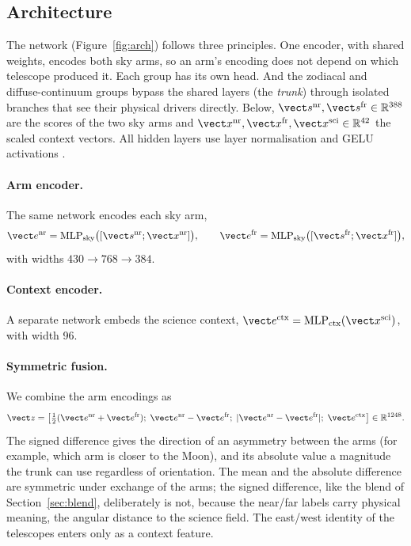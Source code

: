 \subsection{Architecture}
\label{sec:arch}

The network (Figure~\ref{fig:arch}) follows three principles. One encoder,
with shared weights, encodes both sky arms, so an arm's encoding does not
depend on which telescope produced it. Each group has its own head. And the
zodiacal and diffuse-continuum groups bypass the shared layers (the
\emph{trunk}) through isolated branches that see their physical drivers
directly. Below, $\vect s^{\rm nr}, \vect s^{\rm fr}\in\mathbb{R}^{388}$ are the
scores of the two sky arms and $\vect x^{\rm nr}, \vect x^{\rm fr},
\vect x^{\rm sci}\in\mathbb{R}^{42}$ the scaled context vectors. All hidden
layers use layer normalisation \citep{Ba2016} and GELU activations
\citep{Hendrycks2016}.

\paragraph{Arm encoder.} The same network encodes each sky arm,
\begin{equation}
  \vect e^{\rm nr} = \mathrm{MLP}_{\rm sky}\big([\vect s^{\rm nr};\vect x^{\rm nr}]\big),
  \qquad
  \vect e^{\rm fr} = \mathrm{MLP}_{\rm sky}\big([\vect s^{\rm fr};\vect x^{\rm fr}]\big),
\end{equation}
with widths $430\to768\to384$.

\paragraph{Context encoder.} A separate network embeds the science context,
$\vect e^{\rm ctx} = \mathrm{MLP}_{\rm ctx}(\vect x^{\rm sci})$, with width
96.

\paragraph{Symmetric fusion.} We combine the arm encodings as
\begin{equation}
  \vect z = \big[\tfrac12(\vect e^{\rm nr}+\vect e^{\rm fr});\;
  \vect e^{\rm nr}-\vect e^{\rm fr};\;
  |\vect e^{\rm nr}-\vect e^{\rm fr}|;\;
  \vect e^{\rm ctx}\big]\in\mathbb{R}^{1248}.
\end{equation}
The signed difference gives the direction of an asymmetry between the arms
(for example, which arm is closer to the Moon), and its absolute value a
magnitude the trunk can use regardless of orientation. The mean and the
absolute difference are symmetric under exchange of the arms; the signed
difference, like the blend of Section~\ref{sec:blend}, deliberately is not,
because the near/far labels carry physical meaning, the angular distance to
the science field. The east/west identity of the telescopes enters only as a
context feature.

